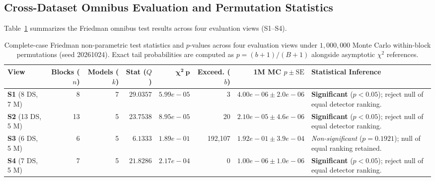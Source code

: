 \documentclass[applsci,article,submit,moreauthors,pdftex]{Definitions/mdpi}
\begin{document}
\subsection{Cross-Dataset Omnibus Evaluation and Permutation Statistics}
Table~\ref{tab:friedman_stats} summarizes the Friedman omnibus test results across four evaluation views (S1--S4).

\begin{table}[htbp]
\centering\footnotesize\setlength{\tabcolsep}{3.0pt}
\caption{Complete-case Friedman non-parametric test statistics and $p$-values across four evaluation views under $1{,}000{,}000$ Monte Carlo within-block permutations (seed 20261024). Exact tail probabilities are computed as $p = (b+1)/(B+1)$ alongside asymptotic $\chi^2$ references.}
\label{tab:friedman_stats}
\begin{tabularx}{\textwidth}{lrrrrrr>{\raggedright\arraybackslash}X}\toprule
\textbf{View} & \textbf{Blocks ($n$)} & \textbf{Models ($k$)} & \textbf{Stat ($Q$)} & $\mathbf{\chi^2\ p}$ & \textbf{Exceed. ($b$)} & \textbf{1M MC $p \pm \text{SE}$} & \textbf{Statistical Inference} \\\midrule
\textbf{S1} (8 DS, 7 M) & 8 & 7 & $29.0357$ & $5.99e-05$ & 3 & $4.00e-06 \pm 2.0e-06$ & \textbf{Significant} ($p < 0.05$); reject null of equal detector ranking. \\
\textbf{S2} (13 DS, 5 M) & 13 & 5 & $23.7538$ & $8.95e-05$ & 20 & $2.10e-05 \pm 4.6e-06$ & \textbf{Significant} ($p < 0.05$); reject null of equal detector ranking. \\
\textbf{S3} (6 DS, 5 M) & 6 & 5 & $6.1333$ & $1.89e-01$ & 192,107 & $1.92e-01 \pm 3.9e-04$ & \textit{Non-significant} ($p = 0.1921$); null of equal ranking retained. \\
\textbf{S4} (7 DS, 5 M) & 7 & 5 & $21.8286$ & $2.17e-04$ & 0 & $1.00e-06 \pm 1.0e-06$ & \textbf{Significant} ($p < 0.05$); reject null of equal detector ranking. \\
\bottomrule
\end{tabularx}
\end{table}
\end{document}
